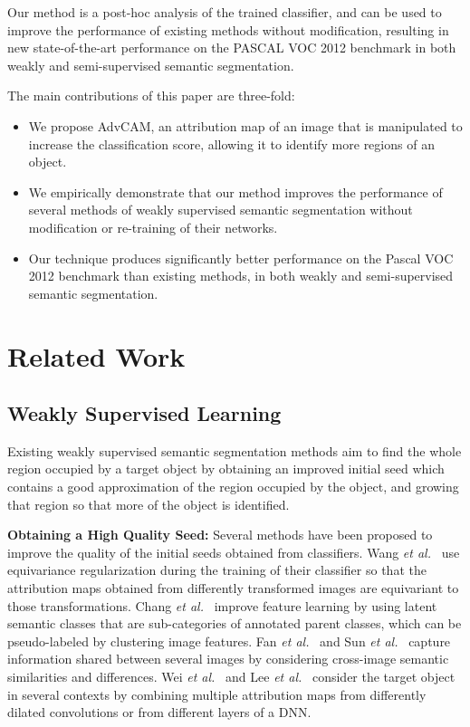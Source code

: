 \documentclass[final]{cvpr}
\begin{document}
Our method is a post-hoc analysis of the trained classifier, and can be used to improve the performance of existing methods without modification, resulting in new state-of-the-art performance on the PASCAL VOC 2012 benchmark in both weakly and semi-supervised semantic segmentation.

The main contributions of this paper are three-fold:
\begin{itemize}
\vspace{-5pt}
	\item[] We propose AdvCAM, an attribution map of an image that is manipulated to increase the classification score, allowing it to identify more regions of an object.
	\vspace{-5pt}
	\item[] We empirically demonstrate that our method improves the performance of several methods of weakly supervised semantic segmentation without modification or re-training of their networks.
	\vspace{-5pt}
	\item[] Our technique produces significantly better performance on the Pascal VOC 2012 benchmark than existing methods, in both weakly and semi-supervised semantic segmentation.
\vspace{-3pt}
\end{itemize}


\section{Related Work}
\subsection{Weakly Supervised Learning}\label{re_weak}
Existing weakly supervised semantic segmentation methods aim to find the whole region occupied by a target object by obtaining an improved initial seed which contains a good approximation of the region occupied by the object, and growing that region so that more of the object is identified.

\textbf{Obtaining a High Quality Seed:}
Several methods have been proposed to improve the quality of the initial seeds obtained from classifiers. 
Wang \textit{et al.}~\cite{wang2020self} use equivariance regularization during the training of their classifier so that the attribution maps obtained from differently transformed images are equivariant to those transformations.
Chang \textit{et al.}~\cite{chang2020weakly} improve feature learning by using latent semantic classes that are sub-categories of annotated parent classes, which can be pseudo-labeled by clustering image features.
Fan \textit{et al.}~\cite{fan2018cian} and Sun \textit{et al.}~\cite{sun2020mining} capture information shared between several images by considering cross-image semantic similarities and differences. 
Wei \textit{et al.}~\cite{wei2018revisiting} and Lee \textit{et al.}~\cite{lee2018robust} consider the target object in several contexts by combining multiple attribution maps from differently dilated convolutions or from different layers of a DNN.
\end{document}
